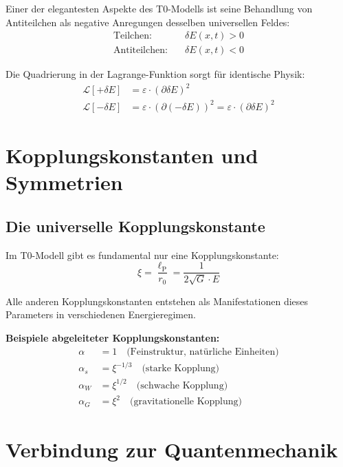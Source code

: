 \documentclass[12pt,a4paper]{report}
\newcommand{\lP}{\ell_{\text{P}}}         %
\newcommand{\rzero}{r_0}                  %
\newcommand{\alphafine}{\alpha}          %
\begin{document}
	Einer der elegantesten Aspekte des T0-Modells ist seine Behandlung von Antiteilchen als negative Anregungen desselben universellen Feldes:
	\begin{align}
		\text{Teilchen:} \quad &\delta E(x,t) > 0 \\
		\text{Antiteilchen:} \quad &\delta E(x,t) < 0
	\end{align}
	
	Die Quadrierung in der Lagrange-Funktion sorgt für identische Physik:
	\begin{align}
		\mathcal{L}[+\delta E] &= \varepsilon \cdot (\partial \delta E)^2 \\
		\mathcal{L}[-\delta E] &= \varepsilon \cdot (\partial(-\delta E))^2 = \varepsilon \cdot (\partial \delta E)^2
	\end{align}
	
	\section{Kopplungskonstanten und Symmetrien}
	
	\subsection{Die universelle Kopplungskonstante}
	
	Im T0-Modell gibt es fundamental nur eine Kopplungskonstante:
	\begin{equation}
		\xi = \frac{\lP}{\rzero} = \frac{1}{2\sqrt{G} \cdot E}
	\end{equation}
	
	Alle anderen Kopplungskonstanten entstehen als Manifestationen dieses Parameters in verschiedenen Energieregimen.
	
	\textbf{Beispiele abgeleiteter Kopplungskonstanten:}
	\begin{align}
		\alphafine &= 1 \quad \text{(Feinstruktur, natürliche Einheiten)} \\
		\alpha_s &= \xi^{-1/3} \quad \text{(starke Kopplung)} \\
		\alpha_W &= \xi^{1/2} \quad \text{(schwache Kopplung)} \\
		\alpha_G &= \xi^2 \quad \text{(gravitationelle Kopplung)}
	\end{align}
	
	\section{Verbindung zur Quantenmechanik}
	
\end{document}
